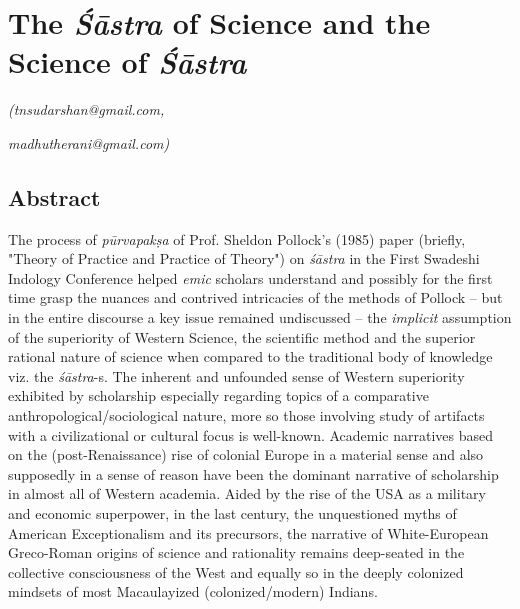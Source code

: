 
\chapter{The \textit{Śāstra} of Science and the Science of \textit{Śāstra}}\label{chapter6}


\begin{flushright}
\textit{\sf\em (tnsudarshan@gmail.com,}

\textit{madhutherani@gmail.com)}
\end{flushright}

\vskip 2pt

\section*{Abstract}

\vskip 4pt

The process of \textit{pūrvapakṣa} of Prof. Sheldon Pollock’s (1985) paper (briefly, "Theory of Practice and Practice of Theory") on \textit{śāstra} in the First Swadeshi Indology Conference helped \textit{emic} scholars understand and possibly for the first time grasp the nuances and contrived intricacies of the methods of Pollock – but in the entire discourse a key issue remained undiscussed – the \textit{implicit} assumption of the superiority of Western Science, the scientific method and the superior rational nature of science when compared to the traditional body of knowledge viz. the \textit{śāstra}-s. The inherent and unfounded sense of Western superiority exhibited by scholarship especially regarding topics of a comparative anthropological/sociological nature, more so those involving study of artifacts with a civilizational or cultural focus is well-known. Academic narratives based on the (post-Renaissance) rise of colonial Europe in a material sense and also supposedly in a sense of reason have been the dominant narrative of scholarship in almost all of Western academia. Aided by the rise of the USA as a military and economic superpower, in the last century, the unquestioned myths of American Exceptionalism and its precursors, the narrative of White-European Greco-Roman origins of science and rationality remains deep-seated in the collective consciousness of the West and equally so in the deeply colonized mindsets of most Macaulayized (colonized/modern) Indians.

